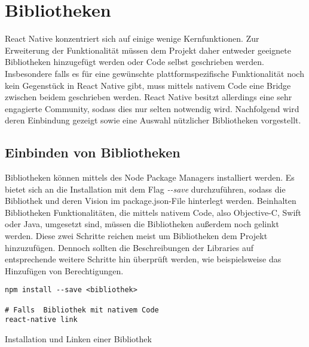 \section{Bibliotheken}
React Native konzentriert sich auf einige wenige Kernfunktionen. Zur Erweiterung der Funktionalität müssen dem Projekt daher entweder geeignete Bibliotheken hinzugefügt werden oder Code selbst geschrieben werden. Insbesondere falls es für eine gewünschte plattformspezifische Funktionalität noch kein Gegenstück in React Native gibt, muss mittels nativem Code eine Bridge zwischen beidem geschrieben werden. React Native besitzt allerdings eine sehr engagierte Community, sodass dies nur selten notwendig wird. Nachfolgend wird deren Einbindung gezeigt sowie eine Auswahl nützlicher Bibliotheken vorgestellt.

\subsection{Einbinden von Bibliotheken}
Bibliotheken können mittels des Node Package Managers installiert werden. Es bietet sich an die Installation mit dem Flag \textit{-{}-save} durchzuführen, sodass die Bibliothek und deren Vision im package.json-File hinterlegt werden. Beinhalten Bibliotheken Funktionalitäten, die mittels nativem Code, also Objective-C, Swift oder Java, umgesetzt sind, müssen die Bibliotheken außerdem noch gelinkt werden. Diese zwei Schritte reichen meist um Bibliotheken dem Projekt hinzuzufügen. Dennoch sollten die Beschreibungen der Libraries auf entsprechende weitere Schritte hin überprüft werden, wie beispielsweise das Hinzufügen von Berechtigungen. 

\begin{listing}[H]
    \begin{verbatim}
npm install --save <bibliothek>

# Falls  Bibliothek mit nativem Code
react-native link
    \end{verbatim}
    \caption{Installation und Linken einer Bibliothek}
    \label{lst:lib_install}
\end{listing}

